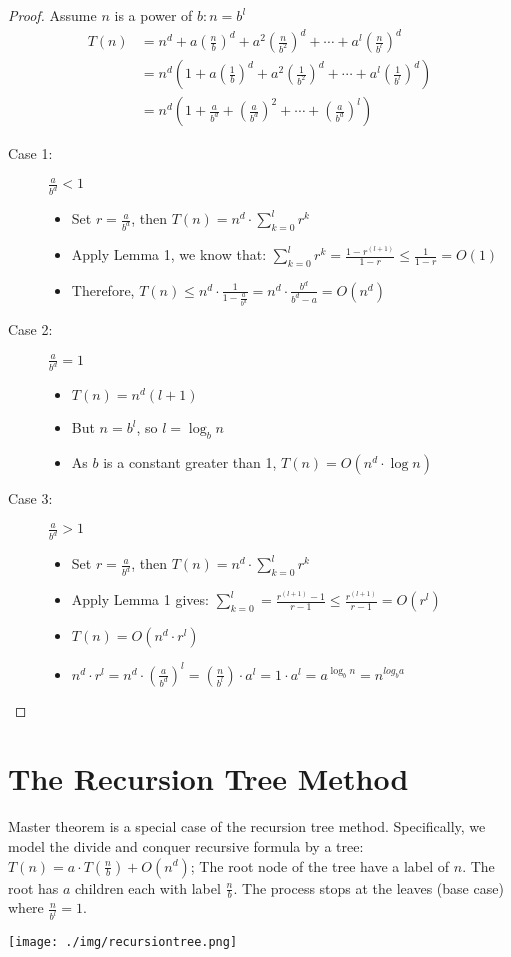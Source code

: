 \documentclass[11pt, a4paper, oneside]{book}
\theoremstyle{theoremdd}
\theoremstyle{remark}
\begin{document}
\begin{proof}
Assume $n$ is a power of $b:n=b^{l}$ 
\begin{align*}
T(n) & = n^d + a(\frac{n}{b})^d + a^2(\frac{n}{b^2})^d + \cdots + a^l(\frac{n}{b^l})^d \\&
       = n^d(1+a(\frac{1}{b})^d + a^2(\frac{1}{b^2})^d + \cdots + a^l(\frac{1}{b^l})^d) \\&
       = n^d(1+\frac{a}{b^d} + (\frac{a}{b^d})^2 + \cdots + (\frac{a}{b^d})^l)
\end{align*}
\begin{description}
\item [Case 1:] $\frac{a}{b^d}<1$ \\
\begin{itemize}
\item Set $r=\frac{a}{b^d}$, then $T(n)=n^d\cdot \sum_{k=0}^{l}r^k$
\item Apply Lemma 1, we know that: $\sum_{k=0}^{l}r^k = \frac{1-r^(l+1)}{1-r} \leq \frac{1}{1-r} = O(1)$
\item Therefore, $T(n) \leq n^d \cdot \frac{1}{1-\frac{a}{b^d}} = n^d\cdot \frac{b^d}{b^d-a} = O(n^d)$
\end{itemize}
\item [Case 2:] $\frac{a}{b^d}=1$
\begin{itemize}
\item $T(n) = n^d(l+1)$
\item But $n=b^l$, so $l=\log_{b} n$
\item As $b$ is a constant greater than 1, $T(n) = O(n^d\cdot \log n)$
\end{itemize}
\item [Case 3:] $\frac{a}{b^d}>1$
\begin{itemize}
\item Set $r=\frac{a}{b^d}$, then $T(n)=n^d\cdot \sum_{k=0}^{l}r^k$
\item Apply Lemma 1 gives: $\sum_{k=0}^{l} = \frac{r^(l+1)-1}{r-1} \leq \frac{r^(l+1)}{r-1} = O(r^l)$
\item $T(n) = O(n^d\cdot r^l)$
\item $n^d\cdot r^l = n^d\cdot (\frac{a}{b^d})^l = (\frac{n}{b^l})\cdot a^l = 1\cdot a^l = a^{\log_{b} n} = n^{log_{b} a}$
\end{itemize}
\end{description}
\end{proof}

\section{The Recursion Tree Method}
Master theorem is a special case of the recursion tree method. Specifically, we model the divide and conquer recursive formula by a tree: $T(n) = a\cdot T(\frac{n}{b}) + O(n^d)$; The root node of the tree have a label of $n$. The root has $a$ children each with label $\frac{n}{b}$. The process stops at the leaves (base case) where $\frac{n}{b^l}=1$.
\begin{center}
\texttt{[image: ./img/recursiontree.png]}
\end{center}
\end{document}
